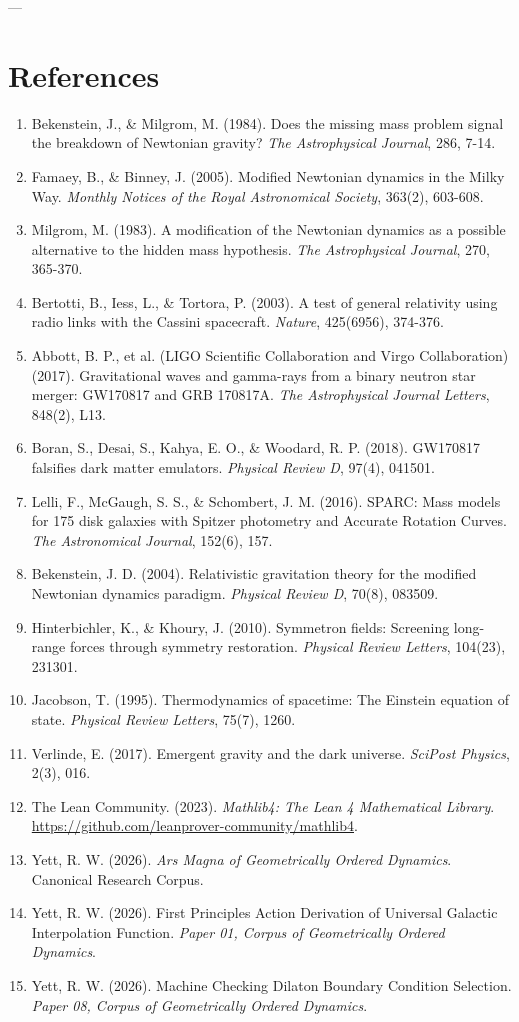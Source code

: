 \documentclass[11pt,a4paper]{article}
\theoremstyle{definition}
\begin{document}
---

\section*{References}
\begin{enumerate}
\item Bekenstein, J., \& Milgrom, M. (1984). Does the missing mass problem signal the breakdown of Newtonian gravity? \emph{The Astrophysical Journal}, 286, 7-14.
\item Famaey, B., \& Binney, J. (2005). Modified Newtonian dynamics in the Milky Way. \emph{Monthly Notices of the Royal Astronomical Society}, 363(2), 603-608.
\item Milgrom, M. (1983). A modification of the Newtonian dynamics as a possible alternative to the hidden mass hypothesis. \emph{The Astrophysical Journal}, 270, 365-370.
\item Bertotti, B., Iess, L., \& Tortora, P. (2003). A test of general relativity using radio links with the Cassini spacecraft. \emph{Nature}, 425(6956), 374-376.
\item Abbott, B. P., et al. (LIGO Scientific Collaboration and Virgo Collaboration) (2017). Gravitational waves and gamma-rays from a binary neutron star merger: GW170817 and GRB 170817A. \emph{The Astrophysical Journal Letters}, 848(2), L13.
\item Boran, S., Desai, S., Kahya, E. O., \& Woodard, R. P. (2018). GW170817 falsifies dark matter emulators. \emph{Physical Review D}, 97(4), 041501.
\item Lelli, F., McGaugh, S. S., \& Schombert, J. M. (2016). SPARC: Mass models for 175 disk galaxies with Spitzer photometry and Accurate Rotation Curves. \emph{The Astronomical Journal}, 152(6), 157.
\item Bekenstein, J. D. (2004). Relativistic gravitation theory for the modified Newtonian dynamics paradigm. \emph{Physical Review D}, 70(8), 083509.
\item Hinterbichler, K., \& Khoury, J. (2010). Symmetron fields: Screening long-range forces through symmetry restoration. \emph{Physical Review Letters}, 104(23), 231301.
\item Jacobson, T. (1995). Thermodynamics of spacetime: The Einstein equation of state. \emph{Physical Review Letters}, 75(7), 1260.
\item Verlinde, E. (2017). Emergent gravity and the dark universe. \emph{SciPost Physics}, 2(3), 016.
\item The Lean Community. (2023). \emph{Mathlib4: The Lean 4 Mathematical Library}. \url{https://github.com/leanprover-community/mathlib4}.
\item Yett, R. W. (2026). \emph{Ars Magna of Geometrically Ordered Dynamics}. Canonical Research Corpus. %
\item Yett, R. W. (2026). First Principles Action Derivation of Universal Galactic Interpolation Function. \emph{Paper 01, Corpus of Geometrically Ordered Dynamics}.
\item Yett, R. W. (2026). Machine Checking Dilaton Boundary Condition Selection. \emph{Paper 08, Corpus of Geometrically Ordered Dynamics}.
\end{enumerate}
\end{document}
